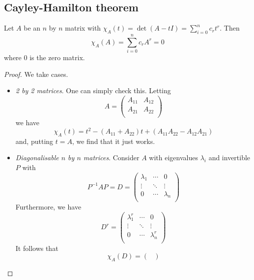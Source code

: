 \documentclass{../template/note}
\begin{document}
    \subsection{Cayley-Hamilton theorem}

    \begin{theorem}
        Let \(A\) be an \(n\) by \(n\) matrix with \(\chi_A(t) = \det(A - tI) = \sum_{i=0}^n c_rt^r\). Then
        \[
            \chi_A(A) = \sum_{i=0}^n c_r A^r = 0
        \]
        where \(0\) is the zero matrix.
    \end{theorem}
    
    \begin{proof}
        We take cases.
        \begin{itemize}
            \item \emph{2 by 2 matrices}. One can simply check this. Letting
            \[
                A = \begin{pmatrix}
                 A_{11} & A_{12} \\
                 A_{21} & A_{22} \\
                \end{pmatrix}
            \]
            we have
            \[
                \chi_A(t) = t^2 - (A_{11}+A_{22})t + (A_{11}A_{22}-A_{12}A_{21})
            \]
            and, putting \(t=A\), we find that it just works.
            \item \emph{Diagonalisable \(n\) by \(n\) matrices}. Consider \(A\) with eigenvalues \(\lambda_i\) and invertible \(P\) with
            \[
                P^{-1}AP = D = \begin{pmatrix}
                 \lambda_1 & \cdots & 0 \\
                 \vdots & \ddots & \vdots \\
                 0 & \cdots & \lambda_n \\
                \end{pmatrix}
            \]
            Furthermore, we have
            \[
                D^r = \begin{pmatrix}
                 \lambda_1^r & \cdots & 0 \\
                 \vdots & \ddots & \vdots \\
                 0 & \cdots & \lambda_n^r \\
                \end{pmatrix}
            \]
            It follows that
            \[
                \chi_A(D) = \begin{pmatrix}

\end{pmatrix}\]
\end{itemize}
\end{proof}
\end{document}
